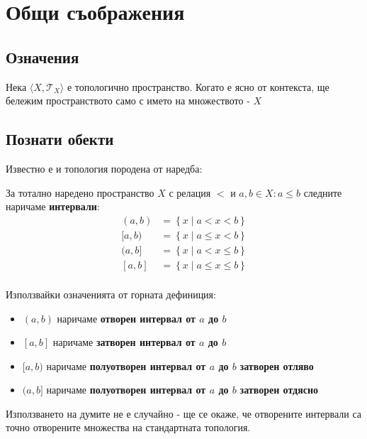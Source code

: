 \section{Общи съображения}
\subsection{Означения}
\begin{notation}
    Нека $\langle X, \mathcal T_X\rangle$ е топологично пространство. Когато е ясно от контекста, ще бележим пространството само с името на множеството - $X$
\end{notation}

\subsection{Познати обекти}
Известно е и топология породена от наредба:
\begin{definition}
    За тотално наредено пространство $X$ с релация $<$ и $a, b \in X: a \leq b$ следните наричаме \textbf{интервали}:
    \begin{equation*}
        \begin{split}
            (a, b) & = \left\{x\mid a < x < b\right\} \\
            [a, b) & = \left\{x\mid a \leq x < b\right\} \\
            (a, b] & = \left\{x\mid a < x \leq b\right\} \\
            [a, b] & = \left\{x\mid a \leq x \leq b\right\} \\
        \end{split}
    \end{equation*}
\end{definition}
\begin{notation}
    Използвайки означенията от горната дефиниция:
    \begin{itemize}
        \item $(a, b)$ наричаме \textbf{отворен интервал от $a$ до $b$}
        \item $[a, b]$ наричаме \textbf{затворен интервал от $a$ до $b$}
        \item $[a, b)$ наричаме \textbf{полуотворен интервал от $a$ до $b$} \textbf{затворен отляво}
        \item $(a, b]$ наричаме \textbf{полуотворен интервал от $a$ до $b$} \textbf{затворен отдясно}
    \end{itemize}
\end{notation}
Използването на думите не е случайно - ще се окаже, че отворените интервали са точно отворените множества на стандартната топология.
